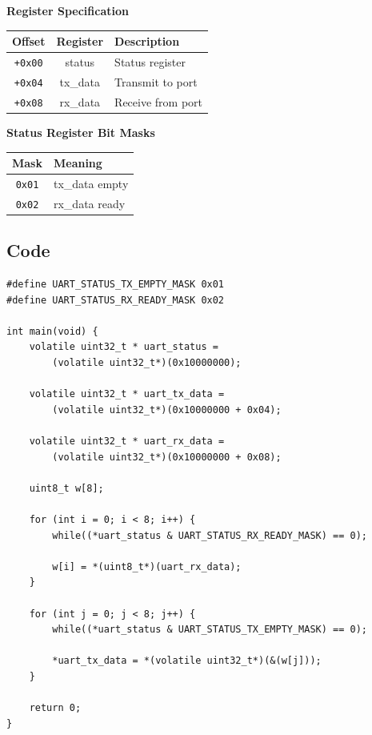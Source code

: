\documentclass[14pt, a4paper]{article}
\begin{document}
\vspace{3mm}

\noindent
\textbf{Register Specification}

\begin{center}
\begin{tabular}{c|c|l}
    \textbf{Offset} & \textbf{Register} & \textbf{Description} \\
    \hline
    \texttt{+0x00} & status & Status register \\
    \texttt{+0x04} & tx\_data & Transmit to port \\
    \texttt{+0x08} & rx\_data & Receive from port
\end{tabular}
\end{center}

\vspace{3mm}

\noindent
\textbf{Status Register Bit Masks}

\begin{center}
\begin{tabular}{c|l}
    \textbf{Mask} & \textbf{Meaning} \\
    \hline
    \texttt{0x01} & tx\_data empty \\
    \texttt{0x02} & rx\_data ready
\end{tabular}
\end{center}

\vspace{5mm}

\newpage

\subsection*{Code}

\begin{lstlisting}[style=cstyle]
#define UART_STATUS_TX_EMPTY_MASK 0x01
#define UART_STATUS_RX_READY_MASK 0x02

int main(void) {
    volatile uint32_t * uart_status =
        (volatile uint32_t*)(0x10000000);

    volatile uint32_t * uart_tx_data =
        (volatile uint32_t*)(0x10000000 + 0x04);

    volatile uint32_t * uart_rx_data =
        (volatile uint32_t*)(0x10000000 + 0x08);

    uint8_t w[8];

    for (int i = 0; i < 8; i++) {
        while((*uart_status & UART_STATUS_RX_READY_MASK) == 0);

        w[i] = *(uint8_t*)(uart_rx_data);
    }

    for (int j = 0; j < 8; j++) {
        while((*uart_status & UART_STATUS_TX_EMPTY_MASK) == 0);

        *uart_tx_data = *(volatile uint32_t*)(&(w[j]));
    }

    return 0;
}
\end{lstlisting}
\end{document}
